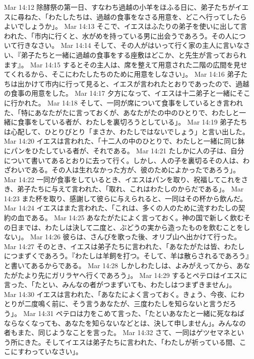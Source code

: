 Mar 14:12  除酵祭の第一日、すなわち過越の小羊をほふる日に、弟子たちがイエスに尋ねた、「わたしたちは、過越の食事をなさる用意を、どこへ行ってしたらよいでしょうか」。
Mar 14:13  そこで、イエスはふたりの弟子を使いに出して言われた、「市内に行くと、水がめを持っている男に出会うであろう。その人について行きなさい。
Mar 14:14  そして、その人がはいって行く家の主人に言いなさい、『弟子たちと一緒に過越の食事をする座敷はどこか、と先生が言っておられます』。
Mar 14:15  するとその主人は、席を整えて用意された二階の広間を見せてくれるから、そこにわたしたちのために用意をしなさい」。
Mar 14:16  弟子たちは出かけて市内に行って見ると、イエスが言われたとおりであったので、過越の食事の用意をした。
Mar 14:17  夕方になって、イエスは十二弟子と一緒にそこに行かれた。
Mar 14:18  そして、一同が席について食事をしているとき言われた、「特にあなたがたに言っておくが、あなたがたの中のひとりで、わたしと一緒に食事をしている者が、わたしを裏切ろうとしている」。
Mar 14:19  弟子たちは心配して、ひとりびとり「まさか、わたしではないでしょう」と言い出した。
Mar 14:20  イエスは言われた、「十二人の中のひとりで、わたしと一緒に同じ鉢にパンをひたしている者が、それである。
Mar 14:21  たしかに人の子は、自分について書いてあるとおりに去って行く。しかし、人の子を裏切るその人は、わざわいである。その人は生れなかった方が、彼のためによかったであろう」。
Mar 14:22  一同が食事をしているとき、イエスはパンを取り、祝福してこれをさき、弟子たちに与えて言われた、「取れ、これはわたしのからだである」。
Mar 14:23  また杯を取り、感謝して彼らに与えられると、一同はその杯から飲んだ。
Mar 14:24  イエスはまた言われた、「これは、多くの人のために流すわたしの契約の血である。
Mar 14:25  あなたがたによく言っておく。神の国で新しく飲むその日までは、わたしは決して二度と、ぶどうの実から造ったものを飲むことをしない」。
Mar 14:26  彼らは、さんびを歌った後、オリブ山へ出かけて行った。
Mar 14:27  そのとき、イエスは弟子たちに言われた、「あなたがたは皆、わたしにつまずくであろう。『わたしは羊飼を打つ。そして、羊は散らされるであろう』と書いてあるからである。
Mar 14:28  しかしわたしは、よみがえってから、あなたがたより先にガリラヤへ行くであろう」。
Mar 14:29  するとペテロはイエスに言った、「たとい、みんなの者がつまずいても、わたしはつまずきません」。
Mar 14:30  イエスは言われた、「あなたによく言っておく。きょう、今夜、にわとりが二度鳴く前に、そう言うあなたが、三度わたしを知らないと言うだろう」。
Mar 14:31  ペテロは力をこめて言った、「たといあなたと一緒に死なねばならなくなっても、あなたを知らないなどとは、決して申しません」。みんなの者もまた、同じようなことを言った。
Mar 14:32  さて、一同はゲツセマネという所にきた。そしてイエスは弟子たちに言われた、「わたしが祈っている間、ここにすわっていなさい」。

